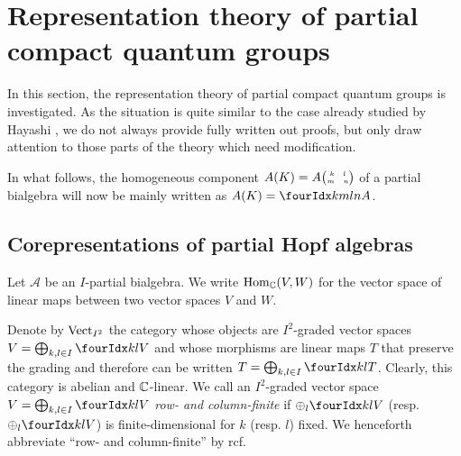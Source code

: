 \section{Representation theory of partial compact quantum groups}

In this section, the representation theory of partial compact quantum groups is investigated. As the situation is quite similar to the case already studied by Hayashi \cite{Hay1}, we do not always provide fully written out proofs, but only draw attention to those parts of the theory which need modification.

In what follows, the homogeneous component $A(K) = A{{\tiny \begin{pmatrix} k \quad l \\ m \quad n\end{pmatrix}}}$ of a partial bialgebra will now be mainly written as $A(K) = \Gr{A}{k}{l}{m}{n}$. 

\subsection{Corepresentations of partial Hopf algebras}


Let $\mathscr{A}$ be an $I$-partial bialgebra. We write
$\operatorname{Hom}_{\mathbb{C}}(V,W)$ for the vector space of linear maps between two vector
spaces $V$ and $W$.



Denote by $\mathrm{Vect}_{I^{2}}$ the category whose objects are $I^{2}$-graded
vector spaces $V=\bigoplus_{k,l\in I} \Gru{V}{k}{l}$ and whose
morphisms are linear maps $T$ that preserve the grading and therefore
can be written $T=\bigoplus_{k,l\in I} \Gru{T}{k}{l}$.  Clearly, this
category is abelian and $\mathbb{C}$-linear.  We call an $I^{2}$-graded vector
space $V=\bigoplus_{k,l\in I} \Gru{V}{k}{l}$ \emph{row- and
  column-finite} if $\oplus_l \Gru{V}{k}{l}$ (resp. $\oplus_l
\Gru{V}{k}{l}$) is finite-dimensional for $k$ (resp. $l$) fixed.
We henceforth abbreviate ``row- and column-finite'' by rcf.

